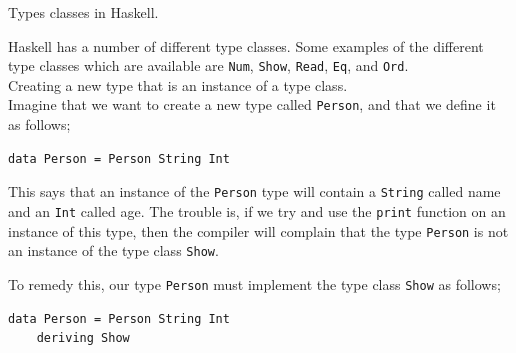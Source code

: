\begin{frame}[t, fragile]{Types classes in Haskell.}

Haskell has a number of different type classes. Some examples of the different type classes which are available are \texttt{Num},
\texttt{Show},
\texttt{Read},
\texttt{Eq}, and
\texttt{Ord}. \\

\textbullet{} Creating a new type that is an instance of a type class. \\

Imagine that we want to create a new type called \texttt{Person}, and that we define
it as follows;

\begin{verbatim}
data Person = Person String Int
\end{verbatim}

This says that an instance of the \texttt{Person} type will contain a
\texttt{String} called name and an \texttt{Int}
called age. The trouble is, if we try and use the \texttt{print} function on an
instance of this type, then the compiler will complain that the type \texttt{Person}
is not an instance of the type class \texttt{Show}.

To remedy this, our type \texttt{Person} must implement the type class
\texttt{Show} as follows;

\begin{verbatim}
data Person = Person String Int
    deriving Show
\end{verbatim}

\end{frame}



